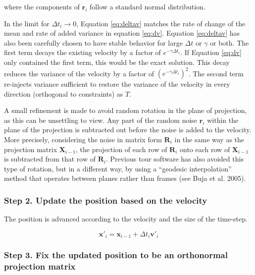 where the components of \(\mathbf r_i\) follow a standard normal distribution.

In the limit for \(\Delta t_i \rightarrow 0\), Equation \eqref{eq:deltav} matches the rate of change of the mean and rate of added variance in equation \eqref{eq:dv}. Equation \eqref{eq:deltav} has also been carefully chosen to have stable behavior for large \(\Delta t\) or \(\gamma\) or both. The first term decays the existing velocity by a factor of \(e^{-\gamma \Delta t_i}\). If Equation \eqref{eq:dv} only contained the first term, this would be the exact solution. This decay reduces the variance of the velocity by a factor of \(\left( e^{-\gamma \Delta t_i} \right) ^2\). The second term re-injects variance sufficient to restore the variance of the velocity in every direction (orthogonal to constraints) as \(T\).

A small refinement is made to avoid random rotation in the plane of projection, as this can be unsettling to view. Any part of the random noise \(\mathbf r_i\) within the plane of the projection is subtracted out before the noise is added to the velocity. More precisely, considering the noise in matrix form \(\mathbf R_i\) in the same way as the projection matrix \(\mathbf X_{i-1}\), the projection of each row of \(\mathbf R_i\) onto each row of \(\mathbf X_{i-1}\) is subtracted from that row of \(\mathbf R_i\). Previous tour software has also avoided this type of rotation, but in a different way, by using a ``geodesic interpolation'' method that operates between planes rather than frames (see Buja et al. 2005).

\hypertarget{step-2.-update-the-position-based-on-the-velocity}{%
\subsubsection{Step 2. Update the position based on the velocity}\label{step-2.-update-the-position-based-on-the-velocity}}

The position is advanced according to the velocity and the size of the time-step.

\begin{equation*}
\mathbf x'_i = \mathbf x_{i-1} + \Delta t_i \mathbf v'_i
\end{equation*}

\hypertarget{step-3.-fix-the-updated-position-to-be-an-orthonormal-projection-matrix}{%
\subsubsection{Step 3. Fix the updated position to be an orthonormal projection matrix}\label{step-3.-fix-the-updated-position-to-be-an-orthonormal-projection-matrix}}

